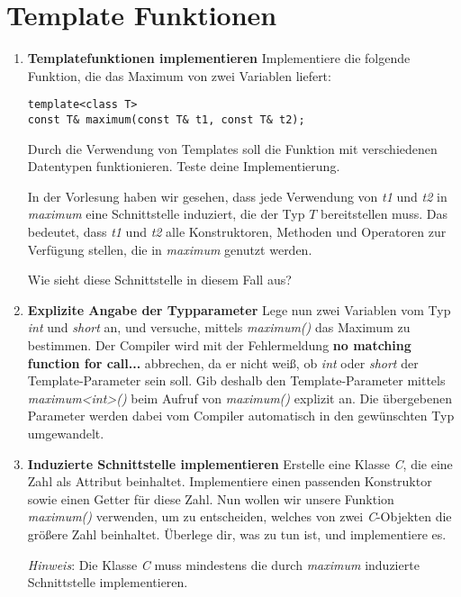 \documentclass[
  accentcolor=tud1c,	%
  colorbacktitle,		%
  inverttitle,			%
  german,				%
  twoside
]{tudexercise}
\begin{document}
\section{Template Funktionen}
\begin{enumerate}
\item \textbf{Templatefunktionen implementieren}
Implementiere die folgende Funktion, die das Maximum von zwei Variablen liefert:
\begin{lstlisting}
template<class T>
const T& maximum(const T& t1, const T& t2);
\end{lstlisting}

Durch die Verwendung von Templates soll die Funktion mit verschiedenen Datentypen funktionieren.
Teste deine Implementierung.

In der Vorlesung haben wir gesehen, dass jede Verwendung von \emph{t1} und \emph{t2} in \emph{maximum} eine Schnittstelle induziert, die der Typ $T$ bereitstellen muss.
Das bedeutet, dass \emph{t1} und \emph{t2} alle Konstruktoren, Methoden und Operatoren zur Verfügung stellen, die in \emph{maximum} genutzt werden.

Wie sieht diese Schnittstelle in diesem Fall aus?

\item \textbf{Explizite Angabe der Typparameter}
Lege nun zwei Variablen vom Typ \emph{int} und \emph{short} an, und versuche, mittels \emph{maximum()} das Maximum zu bestimmen.
Der Compiler wird mit der Fehlermeldung \textbf{no matching function for call...} abbrechen, da er nicht weiß, ob \emph{int} oder \emph{short} der Template-Parameter sein soll.
Gib deshalb den Template-Parameter mittels \emph{maximum<int>()} beim Aufruf von \emph{maximum()} explizit an.
Die übergebenen Parameter werden dabei vom Compiler automatisch in den gewünschten Typ umgewandelt.

\item \textbf{Induzierte Schnittstelle implementieren}
Erstelle eine Klasse \emph{C}, die eine Zahl als Attribut beinhaltet. Implementiere einen passenden Konstruktor sowie einen Getter für diese Zahl. Nun wollen wir unsere Funktion  \emph{maximum()} verwenden, um zu entscheiden, welches von zwei \emph{C}-Objekten die größere Zahl beinhaltet.
Überlege dir, was zu tun ist, und implementiere es. 

\emph{Hinweis}: Die Klasse \emph{C} muss mindestens die durch \emph{maximum} induzierte Schnittstelle implementieren.

\end{enumerate}
\end{document}
